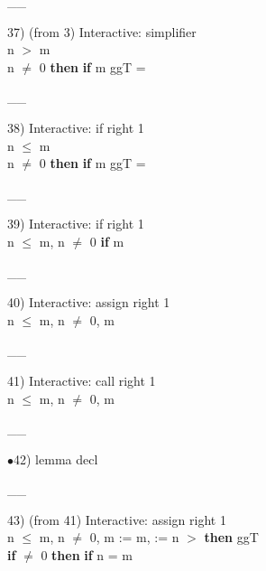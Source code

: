 \documentclass[a4paper]{article}
\begin{document}
\vspace{-1.5ex}\_\hrulefill \_

37)  (from 3) Interactive: simplifier \\
\tabf \Not n $>$ m \\
\Fol {} n $\neq$ 0 {\bf then} {\bf if} m %
\Do ggT\Dc {} = 

\vspace{-1.5ex}\_\hrulefill \_

38) Interactive: if right  1\\
\tabf n $\le$ m \\
\Fol {} n $\neq$ 0 {\bf then} {\bf if} m %
\Do ggT\Dc {} = 

\vspace{-1.5ex}\_\hrulefill \_

39) Interactive: if right  1\\
n $\le$ m, n $\neq$ 0 \Fol \Do 
{\bf if} m %

\vspace{-1.5ex}\_\hrulefill \_

40) Interactive: assign right  1\\
n $\le$ m, n $\neq$ 0, m %

\vspace{-1.5ex}\_\hrulefill \_

41) Interactive: call right  1\\
n $\le$ m, n $\neq$ 0, m %

\vspace{-1.5ex}\_\hrulefill \_

$\bullet$42) lemma decl \\
 \Fol 

\vspace{-1.5ex}\_\hrulefill \_

43)  (from 41) Interactive: assign right  1\\
\tabf n $\le$ m, n $\neq$ 0, m %
\Fol \Do {} := m,  := n\Dc
{}  $>$  {\bf then} ggT \\
 \tabf \tabudo{}\tabudc{} {\bf if}  $\neq$ 0 {\bf then} {\bf if}  %
n = m
\end{document}
